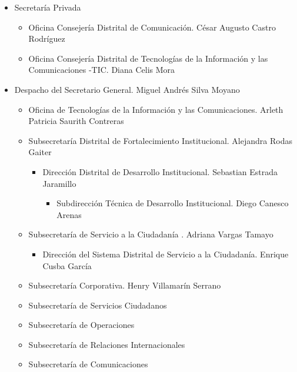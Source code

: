 \documentclass[
	a4paper, %
	12pt, %
]{include/CSSullivanBusinessReport}
\def\tightlist{}
\begin{document}
\begin{itemize}
\tightlist
\item
  Secretaría Privada

  \begin{itemize}
  \tightlist
  \item
    Oficina Consejería Distrital de Comunicación. César Augusto Castro
    Rodríguez
  \item
    Oficina Consejería Distrital de Tecnologías de la Información y las
    Comunicaciones -TIC. Diana Celis Mora
  \end{itemize}
\item
  Despacho del Secretario General. Miguel Andrés Silva Moyano

  \begin{itemize}
  \tightlist
  \item
    Oficina de Tecnologías de la Información y las Comunicaciones.
    Arleth Patricia Saurith Contreras
  \item
    Subsecretaría Distrital de Fortalecimiento Institucional. Alejandra
    Rodas Gaiter

    \begin{itemize}
    \tightlist
    \item
      Dirección Distrital de Desarrollo Institucional. Sebastian Estrada
      Jaramillo

      \begin{itemize}
      \tightlist
      \item
        Subdirección Técnica de Desarrollo Institucional. Diego Canesco
        Arenas
      \end{itemize}
    \end{itemize}
  \item
    Subsecretaría de Servicio a la Ciudadanía . Adriana Vargas Tamayo

    \begin{itemize}
    \tightlist
    \item
      Dirección del Sistema Distrital de Servicio a la Ciudadanía.
      Enrique Cusba García
    \end{itemize}
  \item
    Subsecretaría Corporativa. Henry Villamarín Serrano
  \item
    Subsecretaría de Servicios Ciudadanos
  \item
    Subsecretaría de Operaciones
  \item
    Subsecretaría de Relaciones Internacionales
  \item
    Subsecretaría de Comunicaciones
  \end{itemize}
\end{itemize}
\end{document}
